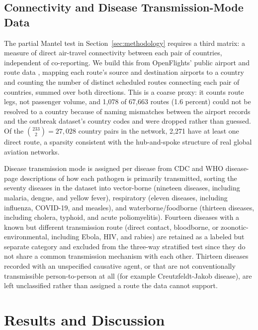 \documentclass[11pt]{article}
\begin{document}
\FloatBarrier

\subsection{Connectivity and Disease Transmission-Mode Data}
\label{sec:connectivity-data}

The partial Mantel test in Section~\ref{sec:methodology} requires a third matrix: a measure
of direct air-travel connectivity between each pair of countries, independent of
co-reporting. We build this from OpenFlights' public airport and route data
\cite{openflights2024}, mapping each route's source and destination airports to a country
and counting the number of distinct scheduled routes connecting each pair of countries,
summed over both directions. This is a coarse proxy: it counts route legs, not passenger
volume, and 1{,}078 of 67{,}663 routes (1.6 percent) could not be resolved to a country
because of naming mismatches between the airport records and the outbreak dataset's country
codes and were dropped rather than guessed. Of the $\binom{233}{2}=27{,}028$ country pairs
in the network, 2{,}271 have at least one direct route, a sparsity consistent with the
hub-and-spoke structure of real global aviation networks.

Disease transmission mode is assigned per disease from CDC and WHO disease-page
descriptions of how each pathogen is primarily transmitted, sorting the seventy diseases in
the dataset into vector-borne (nineteen diseases, including malaria, dengue, and yellow
fever), respiratory (eleven diseases, including influenza, COVID-19, and measles), and
waterborne/foodborne (thirteen diseases, including cholera, typhoid, and acute
poliomyelitis). Fourteen diseases with a known but different transmission route (direct
contact, bloodborne, or zoonotic-environmental, including Ebola, HIV, and rabies) are
retained as a labeled but separate category and excluded from the three-way stratified test
since they do not share a common transmission mechanism with each other. Thirteen diseases
recorded with an unspecified causative agent, or that are not conventionally transmissible
person-to-person at all (for example Creutzfeldt-Jakob disease), are left unclassified
rather than assigned a route the data cannot support.

\FloatBarrier

\section{Results and Discussion}
\label{sec:results}
\end{document}
